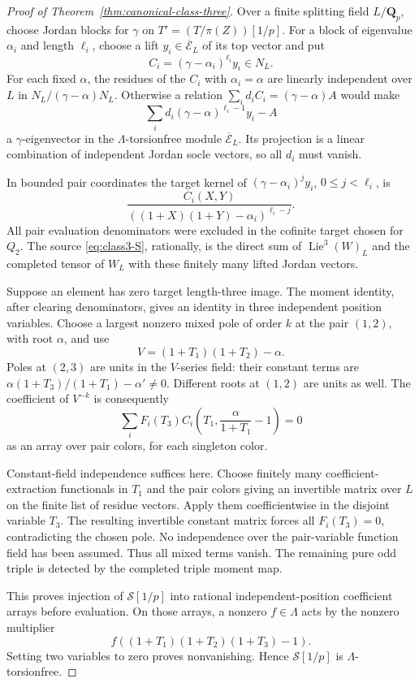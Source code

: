 \documentclass[11pt]{article}
\theoremstyle{definition}\newtheorem{definition}[theorem]{Definition}
\begin{document}
\begin{proof}[Proof of Theorem~\ref{thm:canonical-class-three}]
Over a finite splitting field \(L/\mathbf Q_p\), choose
Jordan blocks for \(\gamma\) on
\(T'=(T/\pi(Z))[1/p]\).
For a block of eigenvalue \(\alpha_i\) and length \(\ell_i\),
choose a lift \(y_i\in\overline{\mathcal E}_L\) of its top vector and put
\[
 C_i=(\gamma-\alpha_i)^{\ell_i}y_i\in N_L.
\]
For each fixed \(\alpha\), the residues of the \(C_i\) with
\(\alpha_i=\alpha\) are linearly independent over \(L\) in
\(N_L/(\gamma-\alpha)N_L\). Otherwise a relation
\(\sum_i d_iC_i=(\gamma-\alpha)A\) would make
\[
 \sum_i d_i(\gamma-\alpha)^{\ell_i-1}y_i-A
\]
a \(\gamma\)-eigenvector in the \(\Lambda\)-torsionfree module
\(\overline{\mathcal E}_L\). Its projection is a linear combination of
independent Jordan socle vectors, so all \(d_i\) must vanish.

In bounded pair coordinates the target kernel of
\((\gamma-\alpha_i)^jy_i\), \(0\le j<\ell_i\), is
\[
 \frac{C_i(X,Y)}
 {((1+X)(1+Y)-\alpha_i)^{\ell_i-j}}.
\]
All pair evaluation denominators were excluded in the
cofinite target chosen for \(Q_2\).
The source \eqref{eq:class3-S}, rationally, is the direct sum
of \(\operatorname{Lie}^3(W)_L\) and the completed tensor
of \(W_L\) with these finitely many lifted Jordan vectors.

Suppose an element has zero target length-three image.
The moment identity, after clearing denominators, gives
an identity in three independent position variables.
Choose a largest nonzero mixed pole of order \(k\) at
the pair \((1,2)\), with root \(\alpha\), and use
\[
 V=(1+T_1)(1+T_2)-\alpha.
\]
Poles at \((2,3)\) are units in the \(V\)-series field:
their constant terms are
\(\alpha(1+T_3)/(1+T_1)-\alpha'\ne0\).
Different roots at \((1,2)\) are units as well.
The coefficient of \(V^{-k}\) is consequently
\[
 \sum_i F_i(T_3)
 C_i\!\left(T_1,\frac{\alpha}{1+T_1}-1\right)=0
\]
as an array over pair colors, for each singleton color.

Constant-field independence suffices here. Choose finitely
many coefficient-extraction functionals in \(T_1\) and
the pair colors giving an invertible matrix over \(L\)
on the finite list of residue vectors.
Apply them coefficientwise in the disjoint variable
\(T_3\). The resulting invertible constant matrix forces
all \(F_i(T_3)=0\), contradicting the chosen pole.
No independence over the pair-variable function field
has been assumed. Thus all mixed terms vanish.
The remaining pure odd triple is detected by the completed
triple moment map.

This proves injection of \(\mathcal S[1/p]\) into rational
independent-position coefficient arrays before evaluation.
On those arrays, a nonzero \(f\in\Lambda\) acts by the
nonzero multiplier
\[
 f((1+T_1)(1+T_2)(1+T_3)-1).
\]
Setting two variables to zero proves nonvanishing.
Hence \(\mathcal S[1/p]\) is \(\Lambda\)-torsionfree.


\end{proof}
\end{document}

